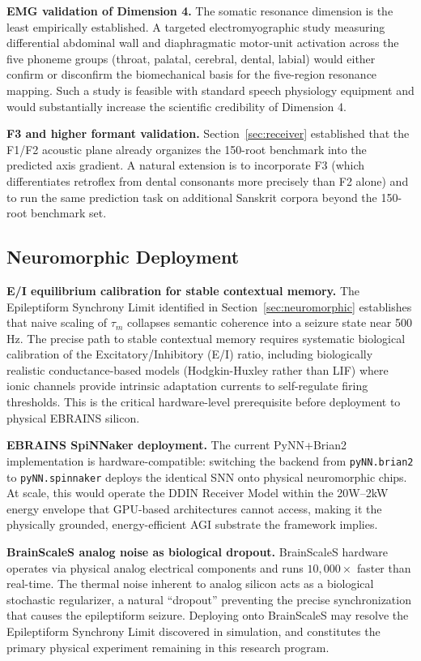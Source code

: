 \documentclass[12pt]{article}
\begin{document}
\textbf{EMG validation of Dimension 4.} The somatic resonance dimension is the least empirically established. A targeted electromyographic study measuring differential abdominal wall and diaphragmatic motor-unit activation across the five phoneme groups (throat, palatal, cerebral, dental, labial) would either confirm or disconfirm the biomechanical basis for the five-region resonance mapping. Such a study is feasible with standard speech physiology equipment and would substantially increase the scientific credibility of Dimension 4.

\textbf{F3 and higher formant validation.} Section~\ref{sec:receiver} established that the F1/F2 acoustic plane already organizes the 150-root benchmark into the predicted axis gradient. A natural extension is to incorporate F3 (which differentiates retroflex from dental consonants more precisely than F2 alone) and to run the same prediction task on additional Sanskrit corpora beyond the 150-root benchmark set.

\subsection{Neuromorphic Deployment}

\textbf{E/I equilibrium calibration for stable contextual memory.} The Epileptiform Synchrony Limit identified in Section~\ref{sec:neuromorphic} establishes that naive scaling of $\tau_m$ collapses semantic coherence into a seizure state near 500 Hz. The precise path to stable contextual memory requires systematic biological calibration of the Excitatory/Inhibitory (E/I) ratio, including biologically realistic conductance-based models (Hodgkin-Huxley rather than LIF) where ionic channels provide intrinsic adaptation currents to self-regulate firing thresholds. This is the critical hardware-level prerequisite before deployment to physical EBRAINS silicon.

\textbf{EBRAINS SpiNNaker deployment.} The current PyNN+Brian2 implementation is hardware-compatible: switching the backend from \texttt{pyNN.brian2} to \texttt{pyNN.spinnaker} deploys the identical SNN onto physical neuromorphic chips. At scale, this would operate the DDIN Receiver Model within the 20W--2kW energy envelope that GPU-based architectures cannot access, making it the physically grounded, energy-efficient AGI substrate the framework implies.

\textbf{BrainScaleS analog noise as biological dropout.} BrainScaleS hardware operates via physical analog electrical components and runs $10{,}000\times$ faster than real-time. The thermal noise inherent to analog silicon acts as a biological stochastic regularizer, a natural ``dropout'' preventing the precise synchronization that causes the epileptiform seizure. Deploying onto BrainScaleS may resolve the Epileptiform Synchrony Limit discovered in simulation, and constitutes the primary physical experiment remaining in this research program.
\end{document}
